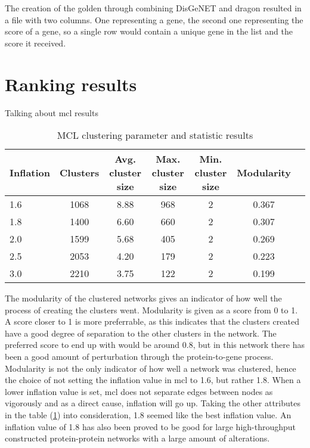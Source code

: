 The creation of the \gls{golden} through combining DisGeNET and \gls{dragon}
resulted in a file with two columns. One representing a gene, the second one
representing the score of a gene, so a single row would contain a unique gene in
the list and the score it received.

\section{Ranking results}
Talking about \gls{mcl} results
\hspace*{-2cm}\begin{table}[H]
    \centering
    \begin{tabular}{| l | c | c | c | c | c | c |}
        \hline
        \textbf{Inflation} & \textbf{Clusters} & \textbf{Avg.  cluster size} &
        \textbf{Max. cluster size} & \textbf{Min. cluster size} &
        \textbf{Modularity} \\
        \hline
        1.6 & 1068 & 8.88 & 968 & 2 & 0.367 \\
        1.8 & 1400 & 6.60 & 660 & 2 & 0.307 \\
        2.0 & 1599 & 5.68 & 405 & 2 & 0.269 \\
        2.5 & 2053 & 4.20 & 179 & 2 & 0.223 \\
        3.0 & 2210 & 3.75 & 122 & 2 & 0.199 \\
        \hline
    \end{tabular}
    \caption{MCL clustering parameter and statistic results}
    \label{tab:mcl-inflation}
\end{table}
The modularity of the clustered networks gives an indicator of how well the
process of creating the clusters went. Modularity is given as a score from 0 to
1. A score closer to 1 is more preferrable, as this indicates that the clusters
created have a good degree of separation to the other clusters in the network.
The preferred score to end up with would be around 0.8, but in this network
there has been a good amount of perturbation through the protein-to-gene
process. Modularity is not the only indicator of how well a network was
clustered, hence the choice of not setting the inflation value in \gls{mcl} to
1.6, but rather 1.8. When a lower inflation value is set, \gls{mcl} does not
separate edges between nodes as vigorously and as a direct cause, inflation will
go up. Taking the other attributes in the table (\ref{tab:mcl-inflation}) into
consideration, 1.8 seemed like the best inflation value. An inflation value of
1.8 has also been proved to be good for large high-throughput constructed
protein-protein networks with a large amount of alterations\cite{mcl-inflation}.

